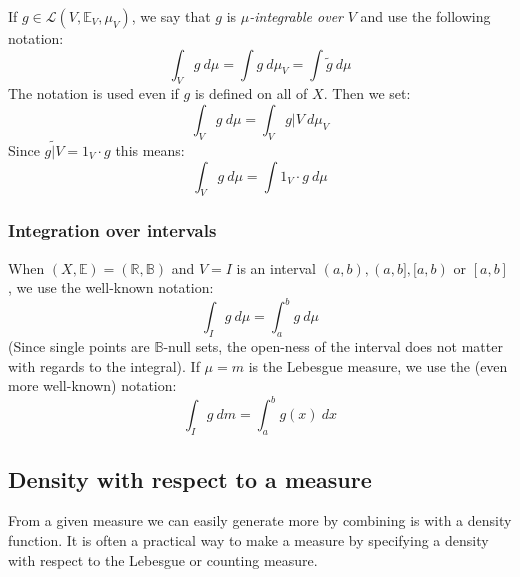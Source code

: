 \documentclass[12pt, a4paper]{article}
\numberwithin{equation}{section}
\begin{document}
If $g\in\mathcal{L}(V,\mathbb{E}_V,\mu_V)$, we say that $g$ is $\mu$\textit{-integrable over} $V$ and use the following notation:
\begin{equation}
\int_V g\ d\mu=\int g\ d\mu_V=\int\tilde{g}\ d\mu
\end{equation}
The notation is used even if $g$ is defined on all of $X$. Then we set:
\begin{equation}
\int_V g\ d\mu=\int_V g|V\ d\mu_V
\end{equation}
Since $\widetilde{g|V}=1_V\cdot g$ this means:
\begin{equation}
\int_V g\ d\mu=\int 1_V\cdot g\ d\mu
\end{equation}

\subsubsection{Integration over intervals}
When $(X,\mathbb{E})=(\mathbb{R},\mathbb{B})$ and $V=I$ is an interval $(a,b), (a,b], [a,b)$ or $[a,b]$, we use the well-known notation:
\begin{equation}
\int_I g\ d\mu=\int_a^b g\ d\mu
\end{equation}
(Since single points are $\mathbb{B}$-null sets, the open-ness of the interval does not matter with regards to the integral). If $\mu=m$ is the Lebesgue measure, we use the (even more well-known) notation:
\begin{equation}
\int_I g\ dm=\int_a^b g(x)\ dx
\end{equation}

\subsection{Density with respect to a measure}
From a given measure we can easily generate more by combining is with a density function. It is often a practical way to make a measure by specifying a density with respect to the Lebesgue or counting measure.
\end{document}
